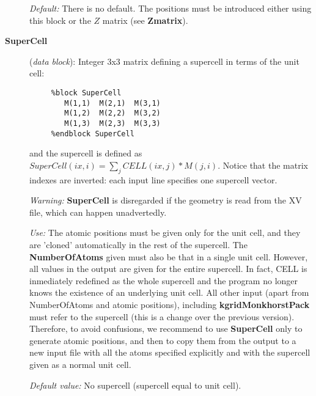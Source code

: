 \documentclass[11pt]{article}
\begin{document}
\begin{description}
{\it Default:} There is no default. The positions must be introduced
either using this block or the $Z$ matrix (see {\bf Zmatrix}).


\item[{\bf SuperCell}] ({\it data block}): 
Integer 3x3 matrix defining a supercell in terms of the unit cell: 

\begin{verbatim}
     %block SuperCell
        M(1,1)  M(2,1)  M(3,1) 
        M(1,2)  M(2,2)  M(3,2) 
        M(1,3)  M(2,3)  M(3,3) 
     %endblock SuperCell
\end{verbatim}

and the supercell is defined as
$SuperCell(ix,i) = \sum_j CELL(ix,j)*M(j,i)$.
Notice that the matrix indexes are inverted: each input line 
specifies one supercell vector.

{\it Warning:} {\bf SuperCell} is disregarded if the geometry is read from
the XV file, which can happen unadvertedly.

{\it Use:} The atomic positions must be given only for the unit cell,
and they are 'cloned' automatically in the rest of the supercell.
The {\bf NumberOfAtoms} given must also be that in a single unit cell.
However, all values in the output are given for the entire supercell. 
In fact, CELL is inmediately redefined as the whole supercell and the 
program no longer knows the existence of an underlying unit cell.
All other input (apart from NumberOfAtoms and atomic positions), 
including {\bf kgridMonkhorstPack} must refer to the supercell 
(this is a change over the previous version). Therefore, to avoid
confusions, we recommend to use {\bf SuperCell} only to
generate atomic positions, and then to copy them from the output
to a new input file with all the atoms specified explicitly and
with the supercell given as a normal unit cell.

{\it Default value:} No supercell (supercell equal to unit cell).

\end{description}
\end{document}
